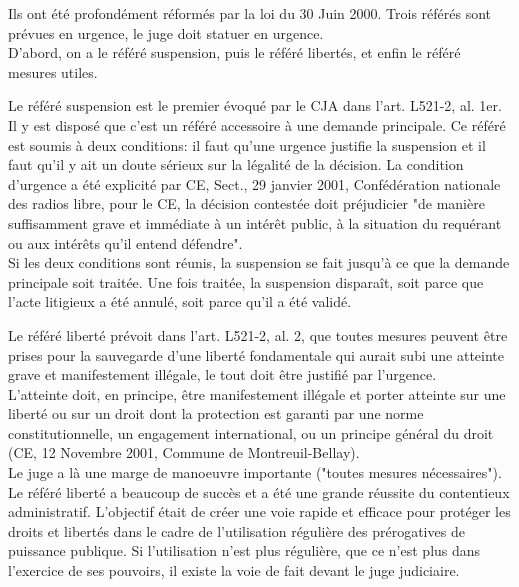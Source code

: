 \documentclass[10pt, a4paper, openany]{book}
\begin{document}
Ils ont été profondément réformés par la loi du 30 Juin 2000. Trois référés sont prévues en urgence, le juge doit statuer en urgence. \\
D'abord, on a le référé suspension, puis le référé libertés, et enfin le référé mesures utiles. 


Le référé suspension est le premier évoqué par le CJA dans l'art. L521-2, al. 1er. Il y est disposé que c'est un référé accessoire à une demande principale. Ce référé est soumis à deux conditions: il faut qu'une urgence justifie la suspension et il faut qu'il y ait un doute sérieux sur la légalité de la décision. La condition d'urgence a été explicité par CE, Sect., 29 janvier 2001, Confédération nationale des radios libre, pour le CE, la décision contestée doit préjudicier "de manière suffisamment grave et immédiate à un intérêt public, à la situation du requérant ou aux intérêts qu'il entend défendre". \\
Si les deux conditions sont réunis, la suspension se fait jusqu'à ce que la demande principale soit traitée. Une fois traitée, la suspension disparaît, soit parce que l'acte litigieux a été annulé, soit parce qu'il a été validé.


Le référé liberté prévoit dans l'art. L521-2, al. 2, que toutes mesures peuvent être prises pour la sauvegarde d'une liberté fondamentale qui aurait subi une atteinte grave et manifestement illégale, le tout doit être justifié par l'urgence. \\
L'atteinte doit, en principe, être manifestement illégale et porter atteinte sur une liberté ou sur un droit dont la protection est garanti par une norme constitutionnelle, un engagement international, ou un principe général du droit (CE, 12 Novembre 2001, Commune de Montreuil-Bellay). \\
Le juge a là une marge de manoeuvre importante ("toutes mesures nécessaires"). \\
Le référé liberté a beaucoup de succès et a été une grande réussite du contentieux administratif. L'objectif était de créer une voie rapide et efficace pour protéger les droits et libertés dans le cadre de l'utilisation régulière des prérogatives de puissance publique. Si l'utilisation n'est plus régulière, que ce n'est plus dans l'exercice de ses pouvoirs, il existe la voie de fait devant le juge judiciaire.
\end{document}
